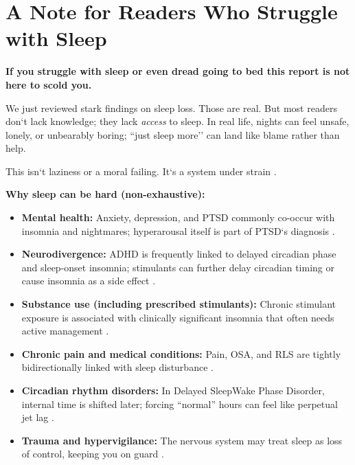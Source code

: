 \section{A Note for Readers Who Struggle with Sleep}\label{sec:note_for_reader}

\textbf{If you struggle with sleep \- or even dread going to bed \- this report is not here to scold you.}

We just reviewed stark findings on sleep loss. Those are real. But most readers don`t lack knowledge; they lack \emph{access} to sleep. In real life, nights can feel unsafe, lonely, or unbearably boring; ``just sleep more’’ can land like blame rather than help.

This isn`t laziness or a moral failing. It`s a system under strain \citep{sateia2014icsd3_overview}.

\textbf{Why sleep can be hard (non-exhaustive):}
\begin{itemize}
  \item \textbf{Mental health:} Anxiety, depression, and PTSD commonly co-occur with insomnia and nightmares; hyperarousal itself is part of PTSD`s diagnosis \citep{lancel2021ptsd_sleep,morgenthaler2018aasm_nightmares}.
  \item \textbf{Neurodivergence:} ADHD is frequently linked to delayed circadian phase and sleep-onset insomnia; stimulants can further delay circadian timing or cause insomnia as a side effect \citep{snitselaar2017adhd_circadian,auger2015aasm_circadian}.
  \item \textbf{Substance use (including prescribed stimulants):} Chronic stimulant exposure is associated with clinically significant insomnia that often needs active management \citep{chiappini2025stimulant_insomnia_mgmt,oliva2025stimulants_safety_meta}.
  \item \textbf{Chronic pain and medical conditions:} Pain, OSA, and RLS are tightly bidirectionally linked with sleep disturbance \citep{duan2024pain_sleep_bidirectional}.
  \item \textbf{Circadian rhythm disorders:} In Delayed Sleep\-Wake Phase Disorder, internal time is shifted later; forcing “normal” hours can feel like perpetual jet lag \citep{auger2015aasm_circadian}.
  \item \textbf{Trauma and hypervigilance:} The nervous system may treat sleep as loss of control, keeping you on guard \citep{sateia2014icsd3_overview}.
\end{itemize}

